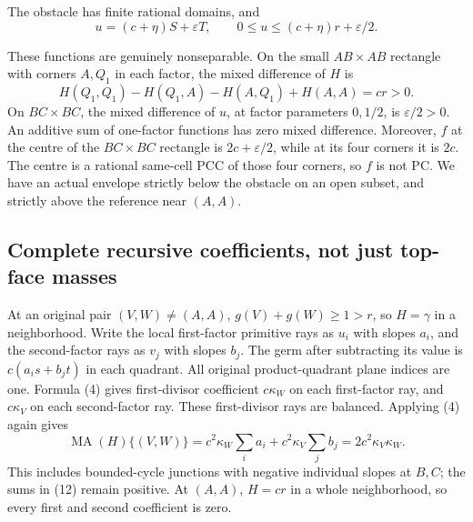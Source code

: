 \documentclass[
  10pt,
]{article}
\begin{document}
The obstacle has finite rational domains, and \[
 u=(c+\eta)S+\varepsilon T,\qquad
              0\leq u\leq(c+\eta)r+\varepsilon/2.            \tag{16}
\]

These functions are genuinely nonseparable. On the small \(AB\times AB\)
rectangle with corners \(A,Q_1\) in each factor, the mixed difference of
\(H\) is \[
 H(Q_1,Q_1)-H(Q_1,A)-H(A,Q_1)+H(A,A)=cr>0.
\] On \(BC\times BC\), the mixed difference of \(u\), at factor
parameters \(0,1/2\), is \(\varepsilon/2>0\). An additive sum of
one-factor functions has zero mixed difference. Moreover, \(f\) at the
centre of the \(BC\times BC\) rectangle is \(2c+\varepsilon/2\), while
at its four corners it is \(2c\). The centre is a rational same-cell PCC
of those four corners, so \(f\) is not PC. We have an actual envelope
strictly below the obstacle on an open subset, and strictly above the
reference near \((A,A)\).

\subsection{Complete recursive coefficients, not just top-face
masses}\label{complete-recursive-coefficients-not-just-top-face-masses}

At an original pair \((V,W)\ne(A,A)\), \(g(V)+g(W)\geq1>r\), so
\(H=\gamma\) in a neighborhood. Write the local first-factor primitive
rays as \(u_i\) with slopes \(a_i\), and the second-factor rays as
\(v_j\) with slopes \(b_j\). The germ after subtracting its value is
\(c(a_is+b_jt)\) in each quadrant. All original product-quadrant plane
indices are one. Formula (4) gives first-divisor coefficient
\(c\kappa_W\) on each first-factor ray, and \(c\kappa_V\) on each
second-factor ray. These first-divisor rays are balanced. Applying (4)
again gives \[
 \operatorname{MA}(H)\{(V,W)\}
 =c^2\kappa_W\sum_i a_i+c^2\kappa_V\sum_j b_j
 =2c^2\kappa_V\kappa_W.                                     \tag{17}
\] This includes bounded-cycle junctions with negative individual slopes
at \(B,C\); the sums in (12) remain positive. At \((A,A)\), \(H=cr\) in
a whole neighborhood, so every first and second coefficient is zero.
\end{document}
